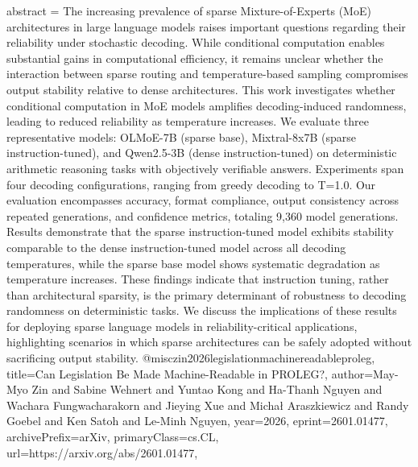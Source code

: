 {      abstract = {The increasing prevalence of sparse Mixture-of-Experts (MoE) architectures in large language models raises important questions regarding their reliability under stochastic decoding. While conditional computation enables substantial gains in computational efficiency, it remains unclear whether the interaction between sparse routing and temperature-based sampling compromises output stability relative to dense architectures. This work investigates whether conditional computation in MoE models amplifies decoding-induced randomness, leading to reduced reliability as temperature increases. We evaluate three representative models: OLMoE-7B (sparse base), Mixtral-8x7B (sparse instruction-tuned), and Qwen2.5-3B (dense instruction-tuned) on deterministic arithmetic reasoning tasks with objectively verifiable answers. Experiments span four decoding configurations, ranging from greedy decoding to T=1.0. Our evaluation encompasses accuracy, format compliance, output consistency across repeated generations, and confidence metrics, totaling 9,360 model generations. Results demonstrate that the sparse instruction-tuned model exhibits stability comparable to the dense instruction-tuned model across all decoding temperatures, while the sparse base model shows systematic degradation as temperature increases. These findings indicate that instruction tuning, rather than architectural sparsity, is the primary determinant of robustness to decoding randomness on deterministic tasks. We discuss the implications of these results for deploying sparse language models in reliability-critical applications, highlighting scenarios in which sparse architectures can be safely adopted without sacrificing output stability.}
}@misc{zin2026legislationmachinereadableproleg,
      title={Can Legislation Be Made Machine-Readable in PROLEG?}, 
      author={May-Myo Zin and Sabine Wehnert and Yuntao Kong and Ha-Thanh Nguyen and Wachara Fungwacharakorn and Jieying Xue and Michał Araszkiewicz and Randy Goebel and Ken Satoh and Le-Minh Nguyen},
      year={2026},
      eprint={2601.01477},
      archivePrefix={arXiv},
      primaryClass={cs.CL},
      url={https://arxiv.org/abs/2601.01477},
}

